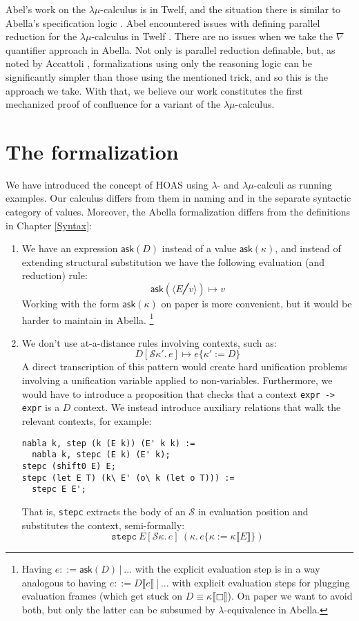 \documentclass[a4paper, 11pt,titlepage, openright, twoside]{report}
\newcommand{\Ask}{\textsf{ask}}
\newcommand{\subst}[2]{\{#1{:=}#2\}}
\renewcommand{\S}{\mathcal{S}}
\newcommand{\+}{\enspace}
\begin{document}
Abel's work on the $λμ$-calculus is in Twelf, and the situation there
is similar to Abella's specification logic%
.
Abel encountered issues with defining parallel reduction for the $λμ$-calculus in Twelf \cite{3rd}.
There are no issues when we take the $\nabla$ quantifier approach in Abella.
Not only is parallel reduction definable,
but, as noted by Accattoli \cite{pearl},
formalizations using only the reasoning logic
can be significantly simpler than those using the mentioned trick,
and so this is the approach we take.
With that, we believe our work constitutes the first mechanized proof of confluence for a variant of the $λμ$-calculus.

\section{The formalization}
We have introduced the concept of HOAS using $λ$- and $λμ$-calculi as running examples.
Our calculus differs from them in naming and in the separate syntactic category of values.
Moreover, the Abella formalization differs from the definitions in Chapter \ref{Syntax}:
\begin{enumerate}
	\item
		We have an expression $\Ask(D)$ instead of a value $\Ask(κ)$,
		and instead of extending structural substitution we have the following evaluation (and reduction) rule:
		$$\Ask(⟨E╱v⟩) ↦ v$$
		Working with the form $\Ask(κ)$ on paper is more convenient,
		but it would be harder to maintain in Abella.%
		\footnote{
			Having $e ::= \Ask(D) │ ...$ with the explicit evaluation step is in a way analogous
			to having $e ::= D⟦e⟧ │ ...$ with explicit evaluation steps for plugging evaluation frames
			(which get stuck on $D ≡ κ⟦□⟧$).
			On paper we want to avoid both, but only the latter can be subsumed by $λ$-equivalence in Abella.
		}
	\item
		We don't use at-a-distance rules involving contexts, such as:
		$$D[\S κ'.\,e] ↦ e\subst{κ'}{D}$$
		A direct transcription of this pattern would create hard unification problems
		involving a unification variable applied to non-variables.
		Furthermore, we would have to introduce a proposition that checks
		that a context \lstinline{expr -> expr} is a $D$ context.
		We instead introduce auxiliary relations that walk the relevant contexts, for example:
		\begin{lstlisting}
nabla k, step (k (E k)) (E' k k) :=
  nabla k, stepc (E k) (E' k);
stepc (shift0 E) E;
stepc (let E T) (k\ E' (o\ k (let o T))) :=
  stepc E E';
		\end{lstlisting}
		That is, \lstinline{stepc} extracts the body of an $\S$ in evaluation position and substitutes the context, semi-formally:
		$$\texttt{stepc}\:E[\S κ.\,e] \:(κ.\,e\subst{κ}{κ⟦E⟧})$$
\end{enumerate}
\end{document}
